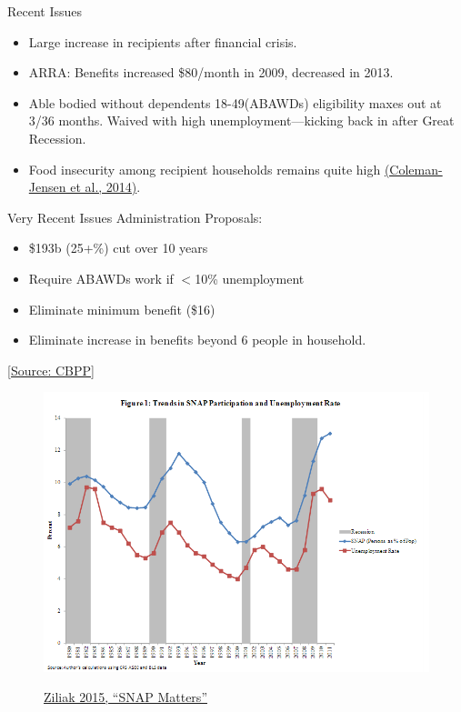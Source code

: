 \documentclass{beamer}
\begin{document}
\begin{frame}{Recent Issues}
\begin{itemize}
\item Large increase in recipients after financial crisis.
\item ARRA: Benefits increased \$80/month in 2009, decreased in 2013.
\item Able bodied without dependents 18-49(ABAWDs) eligibility maxes out at 3/36 months. Waived with high unemployment---kicking back in after Great Recession.
\item Food insecurity among recipient households remains quite high \href{http://www.ers.usda.gov/media/1896841/err194.pdf}{(Coleman-Jensen et al., 2014)}.
\end{itemize}
\end{frame}

\begin{frame}{Very Recent Issues}
Administration Proposals:
\begin{itemize}
\item \$193b (25+\%) cut over 10 years
\item Require ABAWDs work if $<$10\% unemployment
\item Eliminate minimum benefit (\$16)
\item Eliminate increase in benefits beyond 6 people in household. 
\end{itemize}
\begin{tiny}
\href{https://www.cbpp.org/research/food-assistance/presidents-budget-would-shift-substantial-costs-to-states-and-cut-food}{[Source: CBPP]}
\end{tiny}
\end{frame}

\begin{frame}
\begin{figure}
\includegraphics[width=\textwidth]{./images/Ziliak.PNG}

\href{http://gattonweb.uky.edu/Faculty/Ziliak/Ziliak_SNAP_100413.pdf}{Ziliak 2015, ``SNAP Matters''}
\end{figure}
\end{frame}
\end{document}
